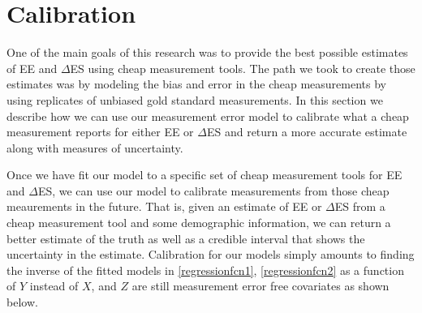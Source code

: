 \documentclass[11pt]{article}\usepackage[]{graphicx}\usepackage[]{color}
\begin{document}


\section{Calibration}

One of the main goals of this research was to provide the best possible estimates of EE and $\Delta$ES using cheap measurement tools. The path we took to create those estimates was by modeling the bias and error in the cheap measurements by using replicates of unbiased gold standard measurements. In this section we describe how we can use our measurement error model to calibrate what a cheap measurement reports for either EE or $\Delta$ES and return a more accurate estimate along with measures of uncertainty. 

Once we have fit our model to a specific set of cheap measurement tools for EE and $\Delta$ES, we can use our model to calibrate measurements from those cheap meaurements in the future. That is, given an estimate of EE or $\Delta$ES from a cheap measurement tool and some demographic information, we can return a better estimate of the truth as well as a credible interval that shows the uncertainty in the estimate. Calibration for our models simply amounts to finding the inverse of the fitted models in \eqref{regressionfcn1}, \eqref{regressionfcn2} as a function of $Y$ instead of $X$, and $Z$ are still measurement error free covariates as shown below.
\end{document}
